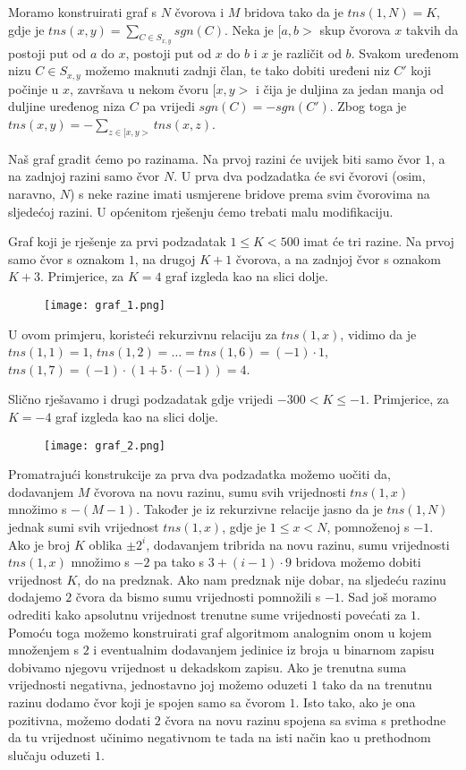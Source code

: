 \documentclass[a4paper]{article}
\begin{document}
Moramo konstruirati graf s $N$ čvorova i $M$ bridova tako da je $tns(1, N) =
K$, gdje je $tns(x, y)=\sum_{C \in S_{x,y}}{sgn(C)}$. Neka je $[a, b>$ skup
čvorova $x$ takvih da postoji put od $a$ do $x$, postoji put od $x$ do $b$ i
$x$ je različit od $b$. Svakom uređenom nizu $C \in S_{x, y}$ možemo maknuti
zadnji član, te tako dobiti uređeni niz $C'$ koji počinje u $x$, završava u
nekom čvoru $[x, y>$ i čija je duljina za jedan manja od duljine uređenog niza
$C$ pa vrijedi $sgn(C) = -sgn(C')$. Zbog toga je $tns(x, y) = -\sum_{z \in [x,
y>}{tns(x,z)}$.

Naš graf gradit ćemo po razinama. Na prvoj razini će uvijek biti samo čvor $1$, a
na zadnjoj razini samo čvor $N$. U prva dva podzadatka će svi čvorovi (osim,
naravno, $N$) s neke razine imati usmjerene bridove prema svim čvorovima na
sljedećoj razini. U općenitom rješenju ćemo trebati malu modifikaciju.

Graf koji je rješenje za prvi podzadatak $1 \le K < 500$ imat će tri razine.
Na prvoj samo čvor s oznakom $1$, na drugoj $K + 1$ čvorova, a na zadnjoj čvor s
oznakom $K+3$. Primjerice, za $K=4$ graf izgleda kao na slici dolje.

\begin{figure}[!htbp]
\centering
\texttt{[image: graf\_1.png]}
\end{figure}

U ovom primjeru, koristeći rekurzivnu relaciju za $tns(1, x)$, vidimo da je
$tns(1, 1) = 1$, $tns(1, 2) = \dots = tns(1, 6) = (-1) \cdot 1$, $tns(1, 7) =
(-1) \cdot (1 + 5 \cdot (-1)) = 4$.

Slično rješavamo i drugi podzadatak gdje vrijedi $-300 < K \le -1$. Primjerice,
za $K=-4$ graf izgleda kao na slici dolje.

\begin{figure}[!htbp]
\centering
\texttt{[image: graf\_2.png]}
\end{figure}

Promatrajući konstrukcije za prva dva podzadatka možemo uočiti da, dodavanjem
$M$ čvorova na novu razinu, sumu svih vrijednosti $tns(1, x)$ množimo s $-(M -
1)$.  Također je iz rekurzivne relacije jasno da je $tns(1, N)$ jednak sumi
svih vrijednost $tns(1, x)$, gdje je $1 \le x < N$, pomnoženoj s $-1$. Ako je
broj $K$ oblika $\pm2^i$, dodavanjem tribrida na novu razinu, sumu vrijednosti
$tns(1, x)$ množimo s $-2$ pa tako s $3 + (i - 1) \cdot 9$ bridova možemo
dobiti vrijednost $K$, do na predznak.  Ako nam predznak nije dobar, na
sljedeću razinu dodajemo $2$ čvora da bismo sumu vrijednosti pomnožili s $-1$.
Sad još moramo odrediti kako apsolutnu vrijednost trenutne sume vrijednosti
povećati za $1$. Pomoću toga možemo konstruirati graf algoritmom analognim onom
u kojem množenjem s $2$ i eventualnim dodavanjem jedinice iz broja u binarnom
zapisu dobivamo njegovu vrijednost u dekadskom zapisu. Ako je trenutna suma
vrijednosti negativna, jednostavno joj možemo oduzeti $1$ tako da na trenutnu
razinu dodamo čvor koji je spojen samo sa čvorom $1$. Isto tako, ako je ona
pozitivna, možemo dodati $2$ čvora na novu razinu spojena sa svima s prethodne
da tu vrijednost učinimo negativnom te tada na isti način kao u prethodnom
slučaju oduzeti $1$.
\end{document}

